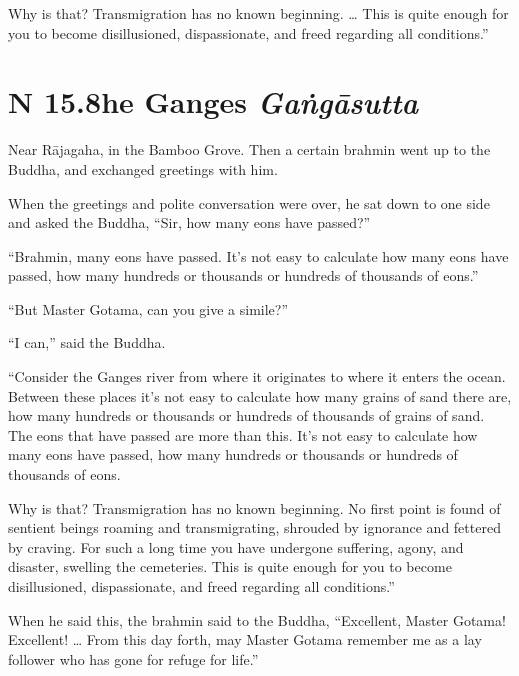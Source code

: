 \documentclass[12pt,openany]{book}%
\newcommand*{\suttatitleacronym}[1]{\smaller[2]{#1}\vspace*{.3em}}
\newcommand*{\suttatitletranslation}[1]{\linebreak{#1}}
\newcommand*{\suttatitleroot}[1]{\linebreak\smaller[2]\itshape{#1}}
\newcommand*{\tocacronym}[1]{\hspace*{-3.3em}{#1}\quad}
\newcommand*{\toctranslation}[1]{#1}
\newcommand*{\tocroot}[1]{(\textit{#1})}
\begin{document}
Why is that? Transmigration has no known beginning. … This is quite enough for you to become disillusioned, dispassionate, and freed regarding all conditions.” 

%
\section*{{\suttatitleacronym SN 15.8}{\suttatitletranslation The Ganges }{\suttatitleroot Gaṅgāsutta}}
\addcontentsline{toc}{section}{\tocacronym{SN 15.8} \toctranslation{The Ganges } \tocroot{Gaṅgāsutta}}

Near \textsanskrit{Rājagaha}, in the Bamboo Grove. Then a certain brahmin went up to the Buddha, and exchanged greetings with him. 

When the greetings and polite conversation were over, he sat down to one side and asked the Buddha, “Sir, how many eons have passed?” 

“Brahmin, many eons have passed. It’s not easy to calculate how many eons have passed, how many hundreds or thousands or hundreds of thousands of eons.” 

“But Master Gotama, can you give a simile?” 

“I can,” said the Buddha. 

“Consider the Ganges river from where it originates to where it enters the ocean. Between these places it’s not easy to calculate how many grains of sand there are, how many hundreds or thousands or hundreds of thousands of grains of sand. The eons that have passed are more than this. It’s not easy to calculate how many eons have passed, how many hundreds or thousands or hundreds of thousands of eons. 

Why is that? Transmigration has no known beginning. No first point is found of sentient beings roaming and transmigrating, shrouded by ignorance and fettered by craving. For such a long time you have undergone suffering, agony, and disaster, swelling the cemeteries. This is quite enough for you to become disillusioned, dispassionate, and freed regarding all conditions.” 

When he said this, the brahmin said to the Buddha, “Excellent, Master Gotama! Excellent! … From this day forth, may Master Gotama remember me as a lay follower who has gone for refuge for life.” 
\end{document}
